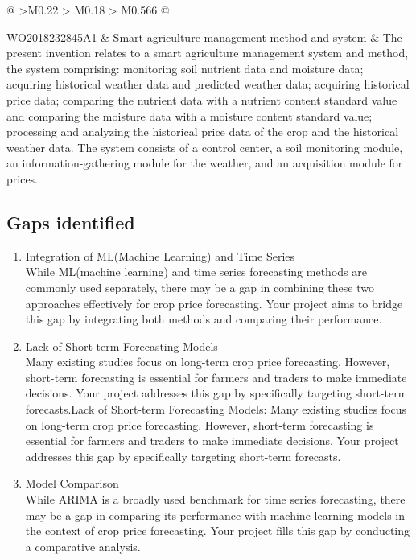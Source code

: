 \begin{longtable}[H]{@{}
        >{\centering\arraybackslash}M{0.22\textwidth}
        >{\justifying\sloppy\arraybackslash} M{0.18\textwidth}
        >{\justifying\sloppy\arraybackslash} M{0.566\textwidth}
        @{}}
                \midrule
                
                WO2018232845A1 & Smart agriculture management method and system & The present invention relates to a smart agriculture management system and method, the system comprising: monitoring soil nutrient data and moisture data; acquiring historical weather data and predicted weather data; acquiring historical price data; comparing the nutrient data with a nutrient content standard value and comparing the moisture data with a moisture content standard value; processing and analyzing the historical price data of the crop and the historical weather data. The system consists of a control center, a soil monitoring module, an information-gathering module for the weather, and an acquisition module for prices.\\
                
                \bottomrule
            
            \caption{Literature Review - summary of studied patents}
        \end{longtable}

    \subsection{Gaps identified}
        \begin{enumerate}
            \item Integration of ML(Machine Learning) and Time Series\\
                While ML(machine learning) and time series forecasting methods are commonly used separately, there may be a gap in combining these two approaches effectively for crop price forecasting. Your project aims to bridge this gap by integrating both methods and comparing their performance.

            \item Lack of Short-term Forecasting Models\\
                Many existing studies focus on long-term crop price forecasting. However, short-term forecasting is essential for farmers and traders to make immediate decisions. Your project addresses this gap by specifically targeting short-term forecasts.Lack of Short-term Forecasting Models: Many existing studies focus on long-term crop price forecasting. However, short-term forecasting is essential for farmers and traders to make immediate decisions. Your project addresses this gap by specifically targeting short-term forecasts.
            \item Model Comparison\\
                While ARIMA is a broadly used benchmark for time series forecasting, there may be a gap in comparing its performance with machine learning models in the context of crop price forecasting. Your project fills this gap by conducting a comparative analysis.
        \end{enumerate}

